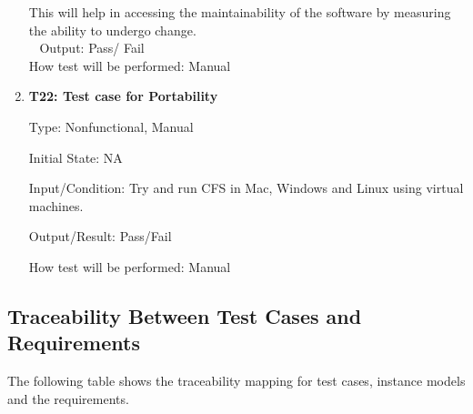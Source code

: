 \documentclass[12pt, titlepage]{article}
\newcommand{\famname}{CFS} %
\begin{document}
\begin{enumerate}
This will help in accessing the maintainability of the software by measuring the ability to undergo change.\\
~\newline	
Output: Pass/ Fail\\
					
How test will be performed: Manual  



\item{\textbf{T22: Test case for Portability}\\}

Type: Nonfunctional, Manual

Initial State: NA

Input/Condition: Try and run \famname{} in Mac, Windows and Linux using virtual machines.

Output/Result: Pass/Fail

How test will be performed: Manual

\end{enumerate}

\subsection{Traceability Between Test Cases and Requirements}

The following table shows the traceability mapping for test cases, instance models and the requirements. 
\end{document}

